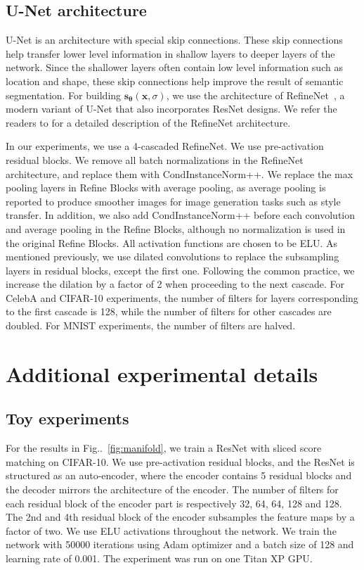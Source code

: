 \documentclass{article}
\makeatletter
\def\@onedot{\ifx\@let@token.\else.\null\fi\xspace}
\DeclareRobustCommand\onedot{\futurelet\@let@token\@onedot}
\newcommand{\figref}[1]{Fig\onedot~\ref{#1}}
\newcommand{\bfx}{\mathbf{x}}
\newcommand{\bftheta}{{\boldsymbol{\theta}}}
\newcommand{\bfs}{\mathbf{s}}
\makeatother
\begin{document}
\subsection{U-Net architecture} 
U-Net is an architecture with special skip connections. These skip connections help transfer lower level information in shallow layers to deeper layers of the network. Since the shallower layers often contain low level information such as location and shape, these skip connections help improve the result of semantic segmentation. For building $\bfs_\bftheta(\bfx, \sigma)$, we use the architecture of RefineNet~\cite{lin2017refinenet}, a modern variant of U-Net that also incorporates ResNet designs. We refer the readers to \cite{lin2017refinenet} for a detailed description of the RefineNet architecture.

In our experiments, we use a 4-cascaded RefineNet. We use pre-activation residual blocks. We remove all batch normalizations in the RefineNet architecture, and replace them with CondInstanceNorm++. We replace the max pooling layers in Refine Blocks with average pooling, as average pooling is reported to produce smoother images for image generation tasks such as style transfer. In addition, we also add CondInstanceNorm++ before each convolution and average pooling in the Refine Blocks, although no normalization is used in the original Refine Blocks. All activation functions are chosen to be ELU. As mentioned previously, we use dilated convolutions to replace the subsampling layers in residual blocks, except the first one. Following the common practice, we increase the dilation by a factor of 2 when proceeding to the next cascade. For CelebA and CIFAR-10 experiments, the number of filters for layers corresponding to the first cascade is 128, while the number of filters for other cascades are doubled. For MNIST experiments, the number of filters are halved. 


\section{Additional experimental details} \label{app:exp}
\subsection{Toy experiments}\label{app:exp:toy}
For the results in \figref{fig:manifold}, we train a ResNet with sliced score matching on CIFAR-10. We use pre-activation residual blocks, and the ResNet is structured as an auto-encoder, where the encoder contains 5 residual blocks and the decoder mirrors the architecture of the encoder. The number of filters for each residual block of the encoder part is respectively 32, 64, 64, 128 and 128. The 2nd and 4th residual block of the encoder subsamples the feature maps by a factor of two. We use ELU activations throughout the network. We train the network with 50000 iterations using Adam optimizer and a batch size of 128 and learning rate of 0.001. The experiment was run on one Titan XP GPU.
\end{document}

